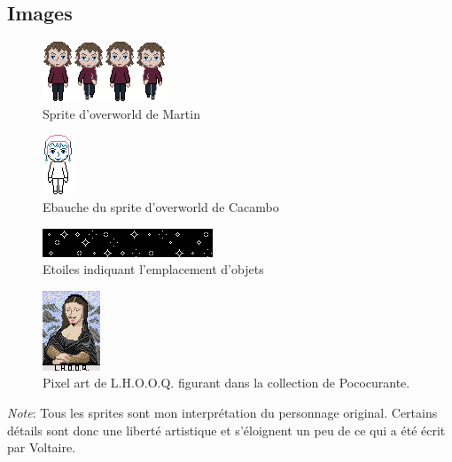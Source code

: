 \documentclass[11pt]{article}
\begin{document}
\newpage
\begin{appendices}
\section{Images}
\begin{figure}[H]
\includegraphics{martinBase}
\centering
\caption{Sprite d'overworld de Martin}
\end{figure}

\begin{figure}[H]
\includegraphics{cacamboSprite}
\centering
\caption{Ebauche du sprite d'overworld de Cacambo}
\end{figure}

\begin{figure}[H]
\includegraphics{sparles}
\centering
\caption{Etoiles indiquant l'emplacement d'objets}
\end{figure}

\begin{figure}[H]
\includegraphics{tableaux}
\centering
\caption{Pixel art de L.H.O.O.Q. figurant dans la collection de Pococurante.}
\end{figure}

\textit{Note}: Tous les sprites sont mon interprétation du personnage original. Certains détails sont donc une liberté artistique et s'éloignent un peu de ce qui a été écrit par Voltaire.


\end{appendices}
\end{document}
